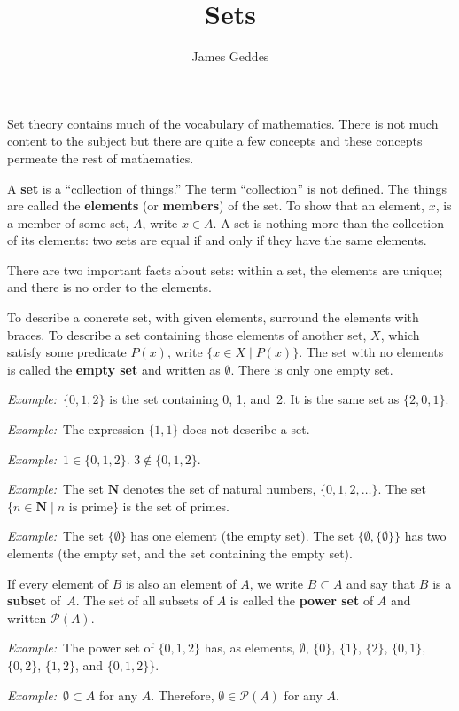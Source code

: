 \documentclass[12pt, a4paper]{article}
\title{\vspace{-6ex}Sets}
\author{James Geddes}
\newcommand{\defn}[1]{\textbf{#1}}
\newcommand{\set}[1]{\mathbold{#1}}
\newcommand{\eg}{\emph{Example:}\relax}
\begin{document}
\maketitle Set theory contains much of the vocabulary of
mathematics. There is not much content to the subject but there are
quite a few concepts and these concepts permeate the rest of
mathematics.

A \defn{set} is a “collection of things.” The term “collection” is not
defined. The things are called the \defn{elements} (or \defn{members})
of the set. To show that an element, $x$, is a member of some set,
$A$, write $x \in A$. A set is nothing more than the collection of its
elements: two sets are equal if and only if they have the same elements.

There are two important facts about sets: within a set, the elements
are unique; and there is no order to the elements.

To describe a concrete set, with given elements, surround the elements with
braces. To describe a set containing those elements of another set, $X$, which
satisfy some predicate $P(x)$, write $\{x \in X \mid P(x)\}$. The set with no
elements is called the \defn{empty set} and written as $\emptyset$. There is only one
empty set.

\eg\ $\{0, 1, 2\}$ is the set containing 0, 1, and~2. It is the same
set as $\{2,0,1\}$.

\eg\ The expression $\{1, 1\}$ does not describe a set.

\eg\ $1\in\{0,1,2\}$. $3\notin\{0,1,2\}$.

\eg\ The set $\set{N}$ denotes the set of natural numbers,
$\{0,1,2,\dotsc\}$. The set $\{n \in \set{N} \mid \text{$n$ is prime}\}$ is
the set of primes.

\eg\ The set $\{\emptyset\}$ has one element (the empty set). The set $\{\emptyset,
\{\emptyset\}\}$ has two elements (the empty set, and the set containing the
empty set).

If every element of $B$ is also an element of $A$, we write $B \subset A$
and say that $B$ is a \defn{subset} of~$A$. The set of all subsets of
$A$ is called the \defn{power set} of $A$ and written $\mathcal{P}(A)$.

\eg\ The power set of $\{0,1,2\}$ has, as elements, $\emptyset$, $\{0\}$,
$\{1\}$, $\{2\}$, $\{0,1\}$, $\{0,2\}$, $\{1,2\}$, and $\{0,1,2\}\}$.

\eg\ $\emptyset \subset A$ for any $A$. Therefore, $\emptyset \in \mathcal{P}(A)$ for any $A$. 
\end{document}
